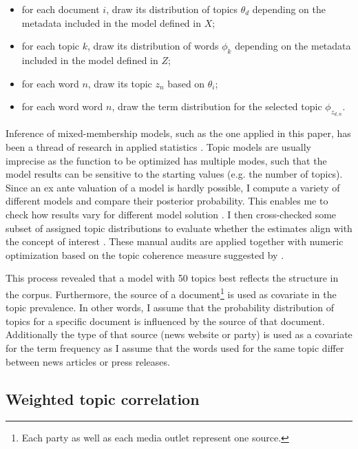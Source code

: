\documentclass[12pt,a4paper,notitlepage]{article}
\begin{document}
\begin{itemize}
	\item for each document $i$, draw its distribution of topics $\theta_d$ depending on the metadata included in the model defined in $X$; 
	\item for each topic $k$, draw its distribution of words $\phi_k$ depending on the metadata included in the model defined in $Z$;
	\item for each word $n$, draw its topic $z_n$ based on $\theta_i$;
	\item for each word word $n$, draw the term distribution for the selected topic $\phi_{z_{d,n}}$.
\end{itemize}

Inference of mixed-membership models, such as the one applied in this paper, has been a thread of research in applied statistics \citep{blei_latent_2003, erosheva_mixed-membership_2004, braun_variational_2010}. Topic models are usually imprecise as the function to be optimized has multiple modes, such that the model results can be sensitive to the starting values (e.g. the number of topics). Since an ex ante valuation of a model is hardly possible, I compute a variety of different models and compare their posterior probability. This enables me to check how results vary for different model solution \citep{roberts_navigating_2016}. I then cross-checked some subset of assigned topic distributions to evaluate whether the estimates align with the concept of interest \citep{gentzkow_text_2017}. These manual audits are applied together with numeric optimization based on the topic coherence measure suggested by \citet{mimno_optimizing_2011}. 

This process revealed that a model with 50 topics best reflects the structure in the corpus. Furthermore, the source of a document\footnote{Each party as well as each media outlet represent one source.} is used as covariate in the topic prevalence. In other words, I assume that the probability distribution of topics for a specific document is influenced by the source of that document. Additionally the type of that source (news website or party) is used as a covariate for the term frequency as I assume that the words used for the same topic differ between news articles or press releases.  


\subsection{Weighted topic correlation}\label{ch_agendacorrl}
\end{document}
